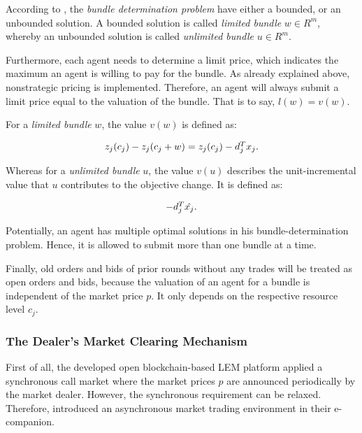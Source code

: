 According to , the \textit{bundle determination problem} have either 
a bounded, or an unbounded solution. A bounded solution is called \textit{limited bundle} 
$w \in R^{m}$, whereby an unbounded solution is called \textit{unlimited bundle}
$u \in R^{m}$.

Furthermore, each agent needs to determine a limit price, which indicates
the maximum an agent is willing to pay for the bundle. 
As already explained above, nonstrategic pricing is implemented. 
Therefore, an agent will always submit a limit price equal to the valuation of the bundle. That is to say, $l(w) = v(w)$.

For a \textit{limited bundle} $w$, the value $v(w)$ is defined as:

\begin{equation*}
 \begin{array}{ll@{}ll}
 z_{j}(c_{j}) - z_{j}(c_{j} + w) = z_{j}(c_{j}) - d_{j}^{T}x_{j}.
 \end{array}
\end{equation*}

Whereas for a \textit{unlimited bundle} $u$, the value $v(u)$ describes the 
unit-incremental value that $u$ contributes to the objective change. It is defined
as:

\begin{equation*}
 \begin{array}{ll@{}ll}
 -d_{j}^{T}\hat{x_{j}}.
 \end{array}
\end{equation*}

Potentially, an agent has multiple optimal solutions in his bundle-determination problem. Hence, it is allowed to submit more than
one bundle at a time. 

Finally, old orders and bids of prior rounds without any trades will be treated 
as open orders and bids, because the valuation of an agent for a bundle is
independent of the market price $p$.
It only depends on the respective resource level $c_{j}$. 

\subsubsection{The Dealer’s Market Clearing Mechanism}
\label{sec:market_clearing_mechanism}
First of all, the developed open blockchain-based LEM platform applied a synchronous call market where the market prices $p$ are announced periodically by the market dealer. 
However, the synchronous requirement can be relaxed. 
Therefore,  introduced an asynchronous market trading environment in their e-companion. 

